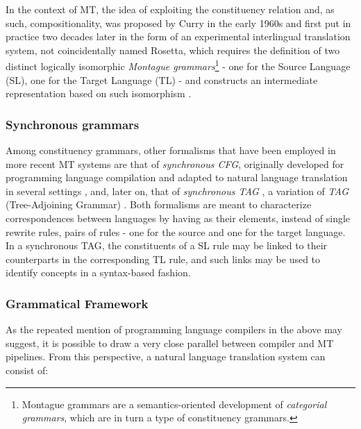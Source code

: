 In the context of MT, the idea of exploiting the constituency relation and, as such, compositionality, was proposed by Curry in the early 1960s \cite{curry61} and first put in practice two decades later in the form of an experimental interlingual translation system, not coincidentally named Rosetta, which requires the definition of two distinct logically isomorphic \textit{Montague grammars}\footnote{Montague grammars are a semantics-oriented development of \textit{categorial grammars}, which are in turn a type of constituency grammars.} - one for the Source Language (SL), one for the Target Language (TL) - and constructs an intermediate representation based on such isomorphism \cite{rosetta}. \smallskip

\subsubsection{Synchronous grammars}
Among constituency grammars, other formalisms that have been employed in more recent MT systems are that of \textit{synchronous CFG}, originally developed for programming language compilation \cite{scfg} and adapted to natural language translation in several settings \cite{nlpscfg0,nlpscfg1,nlpscfg2,nlpscfg3}, and, later on, that of \textit{synchronous TAG} \cite{stag}, a variation of \textit{TAG} (Tree-Adjoining Grammar) \cite{tag}.
Both formalisms are meant to characterize correspondences between languages by having as their elements, instead of single rewrite rules, pairs of rules - one for the source and one for the target language. In a synchronous TAG, the constituents of a SL rule may be linked to their counterparts in the corresponding TL rule, and such links may be used to identify concepts in a syntax-based fashion. \smallskip

\subsubsection{Grammatical Framework} \label{gf}
As the repeated mention of programming language compilers in the above may suggest, it is possible to draw a very close parallel between compiler and MT pipelines. From this perspective, a natural language translation system can consist of: \smallskip

